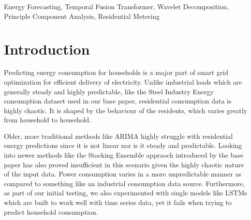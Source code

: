 \begin{abstract}
Prediction of residential electricity consumption is a challenging time-series problem, primarily because demand varies wildly from 1 household to another based on individual house-to-house usage patterns. A lot of factors like long range monthly and weekly rhythmns as well as short term factors like high power appliances heavily influence the electricity consumption. In this paper, we present a newer, more modern method of electricity demand prediction by framing it time-series problem that can be solved using the transformer and attention mechanism. Using the Temporal Fusion Transformer (TFT) model, along with various engineered power features to improve input feature quality as well as application of preprocessing techniques like Principle Component Analysis (PCA) and Wavelet as well as Bayesian Hyperparameter search, we were able to attain a peak performance on the test set of MAE: 78.57, RMSE: 257.02, R$^2$ 0.8674 and MAPE: 23.57\%. During our experiements, we created 4 variations of the initial model to test the effect of PCA, Wavelet and Bayesian Hyperparameter search on the performance of the model. We also compared our results to the base paper LSTM-SVR study on our dataset \cite{reddy2022stacking} and found that TFT is better suited to residential forecasting because it utilizes the attention mechanism. Further, we also compared it to older baseline architectures like ARIMA and SARIMA. 
\end{abstract}
 
\begin{IEEEkeywords}
Energy Forecasting, Temporal Fusion Transformer, Wavelet Decomposition, Principle Component Analysis, Residential Metering
\end{IEEEkeywords}
 
\section{Introduction}
 
Predicting energy consumption for households is a major part of smart grid optimization for efficient delivery of electricity. Unlike industrial loads which are generally steady and highly predictable, like the Steel Industry Energy consumption dataset used in our base paper, residential consumption data is highly chaotic. It is shaped by the behaviour of the residents, which varies greatly from household to household. 

Older, more traditional methods like ARIMA highly struggle with residential energy predictions since it is not linear nor is it steady and predictable. Looking into newer methods like the Stacking Ensemble appraoch introduced by the base paper has also proved insufficient in this scenario given the highly chaotic nature of the input data. Power consumption varies in a more unpredictable manner as compared to something like an industrial consumption data source. Furthermore, as part of our initial testing, we also experimented with single models like LSTMs which are built to work well with time series data, yet it fails when trying to predict household consumption. 


